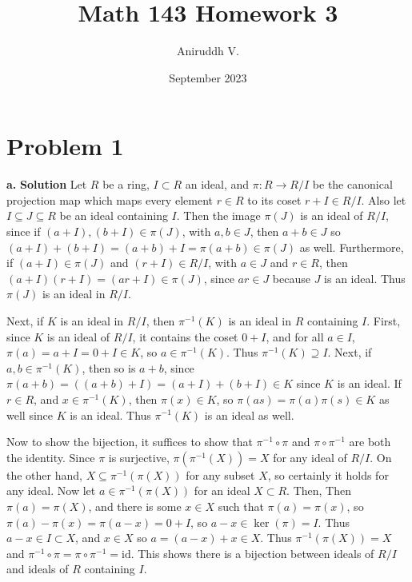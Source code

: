 \documentclass{article}
\title{Math 143 Homework 3}
\author{Aniruddh V.}
\date{September 2023}
\begin{document}
\maketitle

\section{Problem 1}
\textbf{a. } \textbf{Solution } Let $R$ be a ring, $I \subset R$ an ideal, and $\pi: R \to R / I$ be the canonical projection map which maps every element $r \in R$ to 
its coset $r + I \in R / I$.  Also let $I \subseteq J \subseteq R$ be an ideal containing $I$. Then the image $\pi(J)$ is an ideal of $R / I$, since if $(a + I), (b+I) \in \pi(J)$,
with $a, b \in J$, then $a + b \in J$ so $(a+I) + (b+I) = (a+b) + I = \pi(a+b) \in \pi(J)$ as well. Furthermore, if $(a + I) \in \pi(J)$ and $(r+I) \in R / I$, with $a \in J$ and $r \in R$, 
then $(a+I)(r+I) = (ar + I)\in \pi(J)$, since $ar \in J$ because $J$ is an ideal. Thus $\pi (J)$ is an ideal in $R / I$.

Next, if $K$ is an ideal in $R / I$, then $\pi^{-1}(K)$ is an ideal in $R$ containing $I$. First, since $K$ is an ideal of $R / I$, it contains the coset $0 + I$, and for all
$a \in I$, $\pi(a) = a + I = 0 + I \in K$, so $a \in  \pi^{-1}(K)$. Thus $\pi^{-1}(K) \supseteq I$. Next, if $a, b \in \pi^{-1}(K)$, then so is $a + b$, since $\pi(a + b) = ((a+b) + I ) = (a + I) + (b + I) \in K$ 
since $K$ is an ideal. If $r \in R$, and $x \in \pi^{-1}(K)$, then $\pi(x) \in K$, so $\pi(as) = \pi(a)\pi(s)  \in K$ as well since $K$ is an ideal. Thus $\pi^{-1}(K)$ is an ideal as well.  

Now to show the bijection, it suffices to show that $ \pi^{-1} \circ \pi$ and $\pi \circ \pi^{-1}$ are both the identity. Since $\pi$ is surjective, $\pi(\pi^{-1}(X)) = X$ for any ideal
of $R / I$. On the other hand, $X \subseteq \pi^{-1}(\pi(X))$ for any subset $X$, so certainly it holds for any ideal. Now let $a \in  \pi^{-1}(\pi(X))$ for an ideal $X \subset R$. Then,
Then $\pi(a) = \pi(X)$, and there is some $x \in X$ such that $\pi(a) = \pi(x)$, so $\pi(a) - \pi(x) = \pi(a-x) = 0 + I$, so $a - x \in \ker(\pi) = I$. Thus $a -x \in I \subset X$, and $x \in X$
so $a = (a - x) + x \in X$. Thus $\pi^{-1}(\pi(X)) = X$ and $\pi^{-1} \circ \pi = \pi \circ \pi^{-1} = \text{id}$. This shows there is a bijection between ideals of $R / I$ and ideals of $R$ containing $I$. \\
\end{document}
